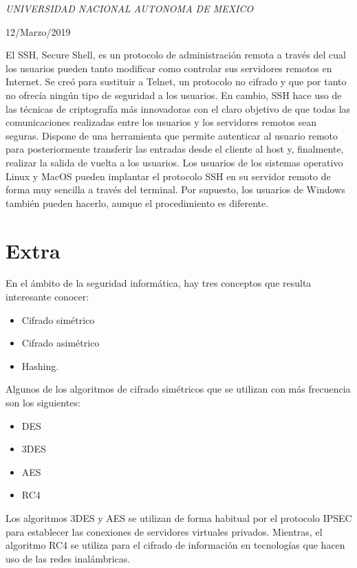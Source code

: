 \documentclass[a4paper, 11pt, oneside]{article}
\begin{document}
\begin{titlepage}
	\textit{UNIVERSIDAD NACIONAL AUTONOMA DE MEXICO} 
	
	\vfill
	
	
	
	
	\vspace{0.3\baselineskip} 
	
	12/Marzo/2019 
	
	 

\end{titlepage}
El SSH, Secure Shell, es un protocolo de administración remota a través del cual los usuarios pueden tanto modificar como controlar sus servidores remotos en Internet. Se creó para sustituir a Telnet, un protocolo no cifrado y que por tanto no ofrecía ningún tipo de seguridad a los usuarios. En cambio, SSH hace uso de las técnicas de criptografía más innovadoras con el claro objetivo de que todas las comunicaciones realizadas entre los usuarios y los servidores remotos sean seguras. Dispone de una herramienta que permite autenticar al usuario remoto para posteriormente transferir las entradas desde el cliente al host y, finalmente, realizar la salida de vuelta a los usuarios. Los usuarios de los sistemas operativo Linux y MacOS pueden implantar el protocolo SSH en su servidor remoto de forma muy sencilla a través del terminal. Por supuesto, los usuarios de Windows también pueden hacerlo, aunque el procedimiento es diferente.

\section*{Extra}

En el ámbito de la seguridad informática, hay tres conceptos que resulta interesante conocer:
\begin{itemize}
    \item Cifrado simétrico
    \item Cifrado asimétrico
    \item Hashing.

\end{itemize}

Algunos de los algoritmos de cifrado simétricos que se utilizan con más frecuencia son los siguientes:
\begin{itemize}
    \item DES
    \item 3DES
    \item AES
    \item RC4
\end{itemize}
Los algoritmos 3DES y AES se utilizan de forma habitual por el protocolo IPSEC para establecer las conexiones de servidores virtuales privados. Mientras, el algoritmo RC4 se utiliza para el cifrado de información en tecnologías que hacen uso de las redes inalámbricas.
\end{document}
